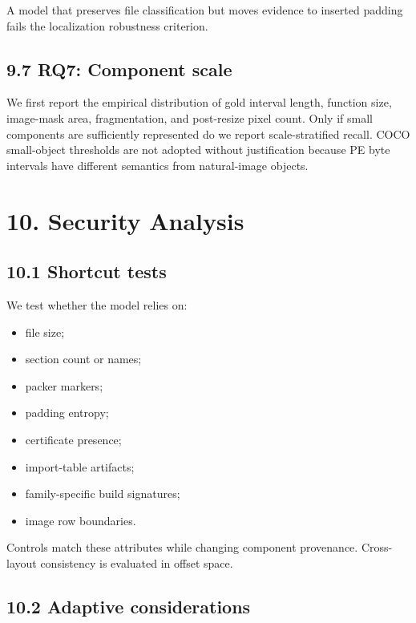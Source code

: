 \documentclass[
  10pt,
]{article}
\providecommand{\tightlist}{%
  \setlength{\itemsep}{0pt}\setlength{\parskip}{0pt}}
\begin{document}
A model that preserves file classification but moves evidence to
inserted padding fails the localization robustness criterion.

\subsection{9.7 RQ7: Component scale}\label{rq7-component-scale}

We first report the empirical distribution of gold interval length,
function size, image-mask area, fragmentation, and post-resize pixel
count. Only if small components are sufficiently represented do we
report scale-stratified recall. COCO small-object thresholds are not
adopted without justification because PE byte intervals have different
semantics from natural-image objects.

\section{10. Security Analysis}\label{security-analysis}

\subsection{10.1 Shortcut tests}\label{shortcut-tests}

We test whether the model relies on:

\begin{itemize}
\tightlist
\item
  file size;
\item
  section count or names;
\item
  packer markers;
\item
  padding entropy;
\item
  certificate presence;
\item
  import-table artifacts;
\item
  family-specific build signatures;
\item
  image row boundaries.
\end{itemize}

Controls match these attributes while changing component provenance.
Cross-layout consistency is evaluated in offset space.

\subsection{10.2 Adaptive considerations}\label{adaptive-considerations}
\end{document}
